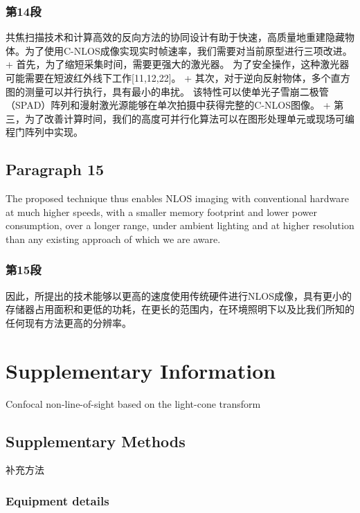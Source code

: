 \documentclass[11pt]{article}
\begin{document}
    \subsubsection{第14段}\label{ux7b2c14ux6bb5}

共焦扫描技术和计算高效的反向方法的协同设计有助于快速，高质量地重建隐藏物体。为了使用C-NLOS成像实现实时帧速率，我们需要对当前原型进行三项改进。
+ 首先，为了缩短采集时间，需要更强大的激光器。
为了安全操作，这种激光器可能需要在短波红外线下工作{[}11,12,22{]}。 +
其次，对于逆向反射物体，多个直方图的测量可以并行执行，具有最小的串扰。
该特性可以使单光子雪崩二极管（SPAD）阵列和漫射激光源能够在单次拍摄中获得完整的C-NLOS图像。
+
第三，为了改善计算时间，我们的高度可并行化算法可以在图形处理单元或现场可编程门阵列中实现。

    \subsection{Paragraph 15}\label{paragraph-15}

The proposed technique thus enables NLOS imaging with conventional
hardware at much higher speeds, with a smaller memory footprint and
lower power consumption, over a longer range, under ambient lighting and
at higher resolution than any existing approach of which we are aware.

    \subsubsection{第15段}\label{ux7b2c15ux6bb5}

因此，所提出的技术能够以更高的速度使用传统硬件进行NLOS成像，具有更小的存储器占用面积和更低的功耗，在更长的范围内，在环境照明下以及比我们所知的任何现有方法更高的分辨率。

    \section{Supplementary Information}\label{supplementary-information}

Confocal non-line-of-sight based on the light-cone transform

    \subsection{Supplementary Methods}\label{supplementary-methods}

补充方法

    \subsubsection{Equipment details}\label{equipment-details}
\end{document}
